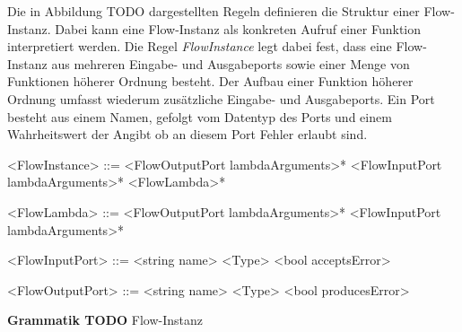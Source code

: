 \documentclass{article}
\begin{document}
    Die in Abbildung TODO dargestellten Regeln definieren die Struktur einer Flow-Instanz. Dabei kann eine Flow-Instanz als konkreten Aufruf einer Funktion interpretiert werden. 
    Die Regel \textit{FlowInstance} legt dabei fest, dass eine Flow-Instanz aus mehreren Eingabe- und Ausgabeports sowie einer Menge von Funktionen höherer Ordnung besteht.
    Der Aufbau einer Funktion höherer Ordnung umfasst wiederum zusätzliche Eingabe- und Ausgabeports.
    Ein Port besteht aus einem Namen, gefolgt vom Datentyp des Ports und einem Wahrheitswert der Angibt ob an diesem Port Fehler erlaubt sind.\\
    \begin{grammar}
        <FlowInstance> ::= <FlowOutputPort lambdaArguments>* <FlowInputPort lambdaArguments>* <FlowLambda>*
        
        <FlowLambda> ::= <FlowOutputPort lambdaArguments>* <FlowInputPort lambdaArguments>*

        <FlowInputPort> ::= <string name> <Type> <bool acceptsError>

        <FlowOutputPort> ::= <string name> <Type> <bool producesError>
    \end{grammar}
    \textbf{Grammatik TODO} Flow-Instanz\\
    \\
\end{document}
